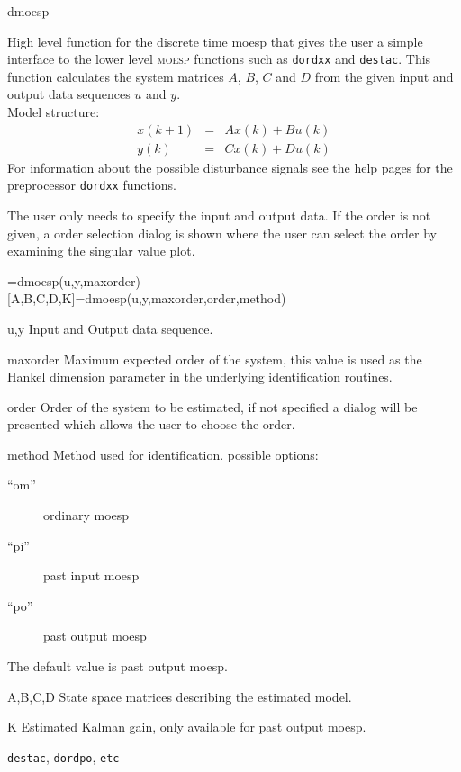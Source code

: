 \documentclass{book}
\newcommand{\moesp}{\textsc{moesp}}
\newcommand{\dordxx}{\texttt{dordxx}}%
\newcommand{\dordpo}{\texttt{dordpo}}
\newcommand{\destac}{\texttt{destac}}
\begin{document}
\begin{command}{dmoesp}
\begin{purpose}
  High level function for the discrete time moesp that gives the user a
  simple interface to the lower level {\moesp} functions such as
  {\dordxx} and {\destac}.  This function calculates the system
  matrices $A$, $B$, $C$ and $D$ from the given input and output data
  sequences $u$ and $y$.\\ Model structure:
  \begin{eqnarray*}
    x(k+1) & = &  A x(k) + B u(k)\\
    y(k) & = & C x(k) + D u(k)
  \end{eqnarray*}
  For information about the possible disturbance signals see the help
  pages for the preprocessor {\dordxx} functions.
  
  The user only needs to specify the input and output data. If the order
  is not given, a order selection dialog is shown where the user can
  select the order by examining the singular value plot.
\end{purpose}
\begin{syntax}
  [A,B,C,D]=dmoesp(u,y,maxorder)\\[0pt]  
  [A,B,C,D,K]=dmoesp(u,y,maxorder,order,method)
\end{syntax}
\begin{inputs}
\item[u,y] Input and Output data sequence.
\item[maxorder] Maximum expected order of the system, this value is 
  used as the Hankel dimension parameter in the underlying
  identification routines.
\item[order] Order of the system to be estimated, if not specified a 
  dialog will be presented which allows the user to choose the
  order.
\item[method] Method used for identification.
  possible options: 
  \begin{description}
  \item[``om'']ordinary moesp
  \item[``pi'']past input moesp 
  \item[``po'']past output moesp 
  \end{description}               
  The default value is past output moesp.
\end{inputs}
\begin{outputs}
\item[A,B,C,D] State space matrices describing the estimated model.
\item[K] Estimated Kalman gain, only available for past output moesp.
\end{outputs}
\begin{seealso}
{\destac}, {\dordpo}, \texttt{etc}
\end{seealso}
\end{command}%
\end{document}
